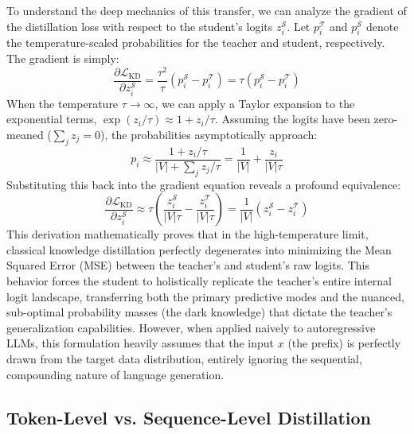 \documentclass{article} %
\newcommand{\loss}{\mathcal{L}}
\begin{document}
To understand the deep mechanics of this transfer, we can analyze the gradient of the distillation loss with respect to the student's logits $z_i^{\mathcal{S}}$. Let $p_i^{\mathcal{T}}$ and $p_i^{\mathcal{S}}$ denote the temperature-scaled probabilities for the teacher and student, respectively. The gradient is simply:
\begin{equation}
    \frac{\partial \loss_{\mathrm{KD}}}{\partial z_i^{\mathcal{S}}} = \frac{\tau^2}{\tau} (p_i^{\mathcal{S}} - p_i^{\mathcal{T}}) = \tau (p_i^{\mathcal{S}} - p_i^{\mathcal{T}})
\end{equation}
When the temperature $\tau \to \infty$, we can apply a Taylor expansion to the exponential terms, $\exp(z_i/\tau) \approx 1 + z_i/\tau$. Assuming the logits have been zero-meaned ($\sum_j z_j = 0$), the probabilities asymptotically approach:
\begin{equation}
    p_i \approx \frac{1 + z_i/\tau}{|V| + \sum_j z_j/\tau} = \frac{1}{|V|} + \frac{z_i}{|V|\tau}
\end{equation}
Substituting this back into the gradient equation reveals a profound equivalence:
\begin{equation}
    \frac{\partial \loss_{\mathrm{KD}}}{\partial z_i^{\mathcal{S}}} \approx \tau \left( \frac{z_i^{\mathcal{S}}}{|V|\tau} - \frac{z_i^{\mathcal{T}}}{|V|\tau} \right) = \frac{1}{|V|} (z_i^{\mathcal{S}} - z_i^{\mathcal{T}})
\end{equation}
This derivation mathematically proves that in the high-temperature limit, classical knowledge distillation perfectly degenerates into minimizing the Mean Squared Error (MSE) between the teacher's and student's raw logits. This behavior forces the student to holistically replicate the teacher's entire internal logit landscape, transferring both the primary predictive modes and the nuanced, sub-optimal probability masses (the dark knowledge) that dictate the teacher's generalization capabilities. However, when applied naively to autoregressive LLMs, this formulation heavily assumes that the input $x$ (the prefix) is perfectly drawn from the target data distribution, entirely ignoring the sequential, compounding nature of language generation.

\subsection{Token-Level vs. Sequence-Level Distillation}
\label{subsec:token_vs_sequence}
\end{document}
